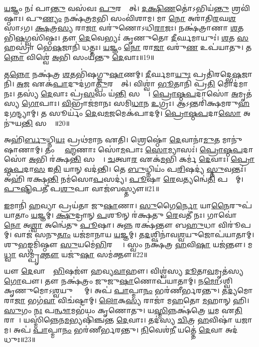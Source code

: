 \ul{𑌯}𑌜𑍍𑌞𑌂 𑌨𑌃॑ 𑌪𑌾\ul{𑌨𑍍𑌤𑍁} 𑌵𑌸॑𑌵𑌃 \ul{𑌪𑍁}𑌰𑌸𑍍𑌤𑌾᳚𑌤𑍍।
\ul{𑌦}\ul{𑌕𑍍𑌷𑌿}\ul{𑌣}𑌤𑍋॑\-𑌽𑌭𑌿𑌯॑\ul{𑌨𑍍𑌤𑍁} 𑌶𑍍𑌰𑌵𑌿॑𑌷𑍍𑌠𑌾𑌃।
𑌪𑍁\ul{𑌣𑍍𑌯𑌂} 𑌨𑌕𑍍𑌷॑𑌤𑍍𑌰\ul{𑌮}𑌭𑌿 𑌸𑌂𑌵𑌿॑𑌶𑌾𑌮।
𑌮𑌾 \ul{𑌨𑍋} 𑌅𑌰𑌾॑𑌤𑌿\ul{𑌰}𑌘\ul{𑌶}\ul{}𑌸𑌾\-𑌽𑌗\sn{}।
\ul{𑌕𑍍𑌷}𑌤𑍍𑌰\ul{𑌸𑍍𑌯} 𑌰𑌾\ul{𑌜𑌾} 𑌵𑌰𑍁॑𑌣𑍋\-𑌽𑌧𑌿\ul{𑌰𑌾}𑌜𑌃।
𑌨𑌕𑍍𑌷॑𑌤𑍍𑌰𑌾𑌣𑌾 \ul{𑌶}𑌤𑌭𑌿॑\ul{𑌷}𑌗𑍍𑌵𑌸𑌿॑𑌷𑍍𑌠𑌃।
𑌤𑍗 \ul{𑌦𑍇}𑌵𑍇𑌭𑍍𑌯𑌃॑ 𑌕𑍃𑌣𑍁𑌤𑍋 \ul{𑌦𑍀}𑌰𑍍𑌘𑌮𑌾𑌯𑍁𑌃॑।
\ul{𑌶}𑌤 \ul{𑌸}𑌹𑌸𑍍𑌰𑌾॑ 𑌭𑍇\ul{𑌷}𑌜𑌾𑌨𑌿॑ 𑌧𑌤𑍍𑌤𑌃।
\ul{𑌯}𑌜𑍍𑌞𑌂 \ul{𑌨𑍋} 𑌰𑌾\ul{𑌜𑌾} 𑌵𑌰𑍁॑\ul{𑌣} 𑌉𑌪॑𑌯𑌾𑌤𑍁।
𑌤\ul{𑌨𑍍𑌨𑍋} 𑌵𑌿𑌶𑍍𑌵𑍇॑ \ul{𑌅}𑌭𑌿 𑌸𑌂𑌯॑𑌨𑍍𑌤𑍁 \ul{𑌦𑍇}𑌵𑌾𑌃॥19॥

𑌤\ul{𑌨𑍍𑌨𑍋} 𑌨𑌕𑍍𑌷॑𑌤𑍍𑌰 \ul{𑌶}𑌤𑌭𑌿॑𑌷𑌗𑍍𑌜𑍁\ul{𑌷𑌾}𑌣𑌮𑍍।
\ul{𑌦𑍀}𑌰𑍍𑌘𑌮𑌾\ul{𑌯𑍁𑌃} 𑌪𑍍𑌰𑌤𑌿॑\-𑌰𑌦𑍍𑌭𑍇\ul{𑌷}𑌜𑌾𑌨𑌿॑।
\ul{𑌅}𑌜 𑌏𑌕॑\ul{𑌪𑌾}𑌦𑍁𑌦॑𑌗𑌾\ul{𑌤𑍍𑌪𑍁}𑌰𑌸𑍍𑌤𑌾᳚𑌤𑍍।
𑌵𑌿𑌶𑍍𑌵𑌾॑ \ul{𑌭𑍂}𑌤𑌾𑌨𑌿॑ 𑌪𑍍𑌰\ul{𑌤𑌿} 𑌮𑍋𑌦॑𑌮𑌾𑌨𑌃।
𑌤𑌸𑍍𑌯॑ \ul{𑌦𑍇}𑌵𑌾𑌃 𑌪𑍍𑌰॑\ul{𑌸}𑌵𑌂 𑌯॑\ul{𑌨𑍍𑌤𑌿} 𑌸𑌰𑍍𑌵𑍇᳚।
\ul{𑌪𑍍𑌰𑍋}\ul{𑌷𑍍𑌠}\ul{𑌪}𑌦𑌾𑌸𑍋॑ \ul{𑌅}𑌮𑍃𑌤॑𑌸𑍍𑌯 \ul{𑌗𑍋}𑌪𑌾𑌃।
\ul{𑌵𑌿}𑌭𑍍𑌰𑌾𑌜॑𑌮𑌾𑌨𑌃 𑌸𑌮𑌿\ul{𑌧𑌾}𑌨 \ul{𑌉}𑌗𑍍𑌰𑌃।
𑌆𑌽𑌨𑍍𑌤𑌰𑌿॑𑌕𑍍𑌷𑌮𑌰𑍁\ul{𑌹}𑌦\ul{𑌗}𑌨𑍍𑌦𑍍𑌯𑌾𑌮𑍍।
𑌤 𑌸𑍂𑌰𑍍𑌯𑌂॑ \ul{𑌦𑍇}𑌵\ul{𑌮}𑌜𑌮𑍇𑌕॑𑌪𑌾𑌦𑌮𑍍।
\ul{𑌪𑍍𑌰𑍋}\ul{𑌷𑍍𑌠}\ul{𑌪}𑌦𑌾\ul{𑌸𑍋} 𑌅𑌨𑍁॑𑌯\ul{𑌨𑍍𑌤𑌿} 𑌸𑌰𑍍𑌵𑍇᳚॥20॥

𑌅𑌹𑌿॑\ul{𑌰𑍍𑌬𑍁}𑌧𑍍𑌨𑌿\ul{𑌯𑌃} 𑌪𑍍𑌰𑌥॑𑌮𑌾𑌨 𑌏𑌤𑌿।
𑌶𑍍𑌰𑍇𑌷𑍍𑌠𑍋॑ \ul{𑌦𑍇}𑌵𑌾𑌨𑌾॑\ul{𑌮𑍁}𑌤 𑌮𑌾𑌨𑍁॑𑌷𑌾𑌣𑌾𑌮𑍍।
𑌤𑌂 𑌬𑍍𑌰𑌾᳚\ul{𑌹𑍍𑌮}𑌣𑌾𑌃 𑌸𑍋॑\ul{𑌮}𑌪𑌾𑌃 \ul{𑌸𑍋}𑌮𑍍𑌯𑌾𑌸𑌃॑।
\ul{𑌪𑍍𑌰𑍋}\ul{𑌷𑍍𑌠}\ul{𑌪}𑌦𑌾𑌸𑍋॑ \ul{𑌅}𑌭𑌿 𑌰॑𑌕𑍍𑌷\ul{𑌨𑍍𑌤𑌿} 𑌸𑌰𑍍𑌵𑍇᳚।
\ul{𑌚}𑌤𑍍𑌵𑌾\ul{𑌰} 𑌏𑌕॑\ul{𑌮}𑌭𑌿 𑌕𑌰𑍍𑌮॑ \ul{𑌦𑍇}𑌵𑌾𑌃।
\ul{𑌪𑍍𑌰𑍋}\ul{𑌷𑍍𑌠}\ul{𑌪}𑌦𑌾\ul{𑌸} 𑌇\ul{𑌤𑌿} 𑌯𑌾𑌨𑍍 𑌵𑌦॑𑌨𑍍𑌤𑌿।
𑌤𑍇 \ul{𑌬𑍁}𑌧𑍍𑌨𑌿𑌯𑌂॑ 𑌪\ul{𑌰𑌿}𑌷𑌦𑍍𑌯॑ \ul{𑌸𑍍𑌤𑍁}𑌵𑌨𑍍𑌤𑌃॑।
𑌅𑌹𑌿॑ 𑌰𑌕𑍍𑌷\ul{𑌨𑍍𑌤𑌿} 𑌨𑌮॑𑌸𑍋\ul{𑌪}𑌸𑌦𑍍𑌯॑।
\ul{𑌪𑍂}𑌷𑌾 \ul{𑌰𑍇}𑌵𑌤𑍍𑌯𑌨𑍍𑌵𑍇॑\ul{𑌤𑌿} 𑌪𑌨𑍍𑌥𑌾᳚𑌮𑍍।
\ul{𑌪𑍁}\ul{𑌷𑍍𑌟𑌿}𑌪𑌤𑍀॑ 𑌪\ul{𑌶𑍁}𑌪𑌾 𑌵𑌾𑌜॑𑌬𑌸𑍍𑌤𑍍𑌯𑍗॥21॥

\ul{𑌇}𑌮𑌾𑌨𑌿॑ \ul{𑌹}𑌵𑍍𑌯𑌾 𑌪𑍍𑌰𑌯॑𑌤𑌾 𑌜𑍁\ul{𑌷𑌾}𑌣𑌾।
\ul{𑌸𑍁}𑌗𑍈\ul{𑌰𑍍𑌨𑍋} 𑌯𑌾\ul{𑌨𑍈}𑌰𑍁𑌪॑𑌯𑌾𑌤𑌾𑌂 \ul{𑌯}𑌜𑍍𑌞𑌮𑍍।
\ul{𑌕𑍍𑌷𑍁}𑌦𑍍𑌰𑌾𑌨𑍍 \ul{𑌪}𑌶𑍂𑌨𑍍 𑌰॑𑌕𑍍𑌷𑌤𑍁 \ul{𑌰𑍇}𑌵𑌤𑍀॑ 𑌨𑌃।
𑌗𑌾𑌵𑍋॑ \ul{𑌨𑍋} 𑌅\ul{𑌶𑍍𑌵𑌾}\ul{} 𑌅𑌨𑍍𑌵𑍇॑𑌤𑍁 \ul{𑌪𑍂}𑌷𑌾।
𑌅\ul{𑌨𑍍𑌨}\ul{} 𑌰𑌕𑍍𑌷॑𑌨𑍍𑌤𑍗 𑌬\ul{𑌹𑍁}𑌧𑌾 𑌵𑌿𑌰𑍂॑𑌪𑌮𑍍।
𑌵𑌾𑌜॑ 𑌸𑌨𑍁\ul{𑌤𑌾𑌂} 𑌯𑌜॑𑌮𑌾𑌨𑌾𑌯 \ul{𑌯}𑌜𑍍𑌞𑌮𑍍।
𑌤\ul{𑌦}𑌶𑍍𑌵𑌿𑌨𑌾॑𑌵\ul{𑌶𑍍𑌵}𑌯𑍁𑌜𑍋𑌪॑𑌯𑌾𑌤𑌾𑌮𑍍।
𑌶𑍁\ul{𑌭}𑌙𑍍𑌗𑌮𑌿॑𑌷𑍍𑌠𑍗 \ul{𑌸𑍁}𑌯𑌮𑍇॑\ul{𑌭𑌿}𑌰𑌶𑍍𑌵𑍈𑌃᳚।
𑌸𑍍𑌵𑌂 𑌨𑌕𑍍𑌷॑𑌤𑍍𑌰 \ul{𑌹}𑌵𑌿\ul{𑌷𑌾} 𑌯𑌜॑𑌨𑍍𑌤𑍗।
𑌮\ul{𑌧𑍍𑌵𑌾} 𑌸𑌮𑍍𑌪𑍃॑\ul{𑌕𑍍𑌤𑍗} 𑌯𑌜𑍁॑\ul{𑌷𑌾} 𑌸𑌮॑𑌕𑍍𑌤𑍗॥22॥

𑌯𑍗 \ul{𑌦𑍇}𑌵𑌾𑌨𑌾𑌂᳚ \ul{𑌭𑌿}𑌷𑌜𑍗॑ 𑌹𑌵𑍍𑌯\ul{𑌵𑌾}𑌹𑍗।
𑌵𑌿𑌶𑍍𑌵॑𑌸𑍍𑌯 \ul{𑌦𑍂}𑌤𑌾\ul{𑌵}𑌮𑍃𑌤॑𑌸𑍍𑌯 \ul{𑌗𑍋}𑌪𑍗।
𑌤𑍗 𑌨𑌕𑍍𑌷॑𑌤𑍍𑌰𑌂 𑌜𑍁𑌜𑍁\ul{𑌷𑌾}𑌣𑍋𑌪॑𑌯𑌾𑌤𑌾𑌮𑍍।
𑌨\ul{𑌮𑍋}𑌽𑌶𑍍𑌵𑌿𑌭𑍍𑌯𑌾𑌂᳚ 𑌕𑍃𑌣𑍁𑌮𑍋\-𑌽\ul{𑌶𑍍𑌵}𑌯𑍁𑌗𑍍𑌭𑍍𑌯𑌾᳚𑌮𑍍।
𑌅𑌪॑ \ul{𑌪𑌾}𑌪𑍍𑌮𑌾\ul{𑌨𑌂} 𑌭𑌰॑𑌣𑍀𑌰𑍍𑌭𑌰𑌨𑍍𑌤𑍁।
𑌤\ul{𑌦𑍍𑌯}𑌮𑍋 𑌰𑌾\ul{𑌜𑌾} 𑌭𑌗॑\ul{𑌵𑌾}\an{} 𑌵𑌿𑌚॑𑌷𑍍𑌟𑌾𑌮𑍍।
\ul{𑌲𑍋}𑌕\ul{𑌸𑍍𑌯} 𑌰𑌾𑌜𑌾॑ 𑌮\ul{𑌹}𑌤𑍋 \ul{𑌮}𑌹𑌾𑌨𑍍 𑌹𑌿।
\ul{𑌸𑍁}𑌗𑌂 \ul{𑌨𑌃} 𑌪\ul{𑌨𑍍𑌥𑌾}𑌮𑌭॑𑌯𑌂 𑌕𑍃𑌣𑍋𑌤𑍁।
𑌯\ul{𑌸𑍍𑌮𑌿}𑌨𑍍𑌨𑌕𑍍𑌷॑𑌤𑍍𑌰𑍇 \ul{𑌯}𑌮 𑌏\ul{𑌤𑌿} 𑌰𑌾𑌜𑌾᳚।
𑌯𑌸𑍍𑌮𑌿॑𑌨𑍍𑌨𑍇𑌨\ul{𑌮}𑌭𑍍𑌯𑌷𑌿॑𑌞𑍍𑌚𑌨𑍍𑌤 \ul{𑌦𑍇}𑌵𑌾𑌃।
𑌤𑌦॑𑌸𑍍𑌯 \ul{𑌚𑌿}𑌤𑍍𑌰 \ul{𑌹}𑌵𑌿𑌷𑌾॑ 𑌯𑌜𑌾𑌮।
𑌅𑌪॑ \ul{𑌪𑌾}𑌪𑍍𑌮𑌾\ul{𑌨𑌂} 𑌭𑌰॑𑌣𑍀𑌰𑍍𑌭𑌰𑌨𑍍𑌤𑍁।
\ul{𑌨𑌿}𑌵𑍇𑌶॑\ul{𑌨𑍀} 𑌯𑌤𑍍𑌤𑍇॑ \ul{𑌦𑍇}𑌵𑌾 𑌅𑌦॑𑌧𑍁𑌃॥23॥\anuvakamend[\ul{𑌤}𑌤𑌾\ul{𑌰} 𑌮𑌹𑍍𑌯𑌂॑ 𑌪𑍍𑌰𑌾\ul{𑌸}𑌚𑍀𑌰𑍍𑌯𑌾 𑌯𑌾᳚𑌨𑍍𑌤𑍁 \ul{𑌯}𑌜𑍍𑌞𑌂 𑌵𑌾𑌚\dng{ꣴ}॑ \ul{𑌸𑍍𑌵}𑌸𑍍𑌤𑌿 \ul{𑌦𑍇}𑌵𑌾 𑌅𑌨𑍁॑𑌯\ul{𑌨𑍍𑌤𑌿} 𑌸\ul{𑌰𑍍𑌵𑍇} 𑌵𑌾𑌜॑𑌬\ul{𑌸𑍍𑌤𑍍𑌯𑍗} 𑌸𑌮॑𑌕𑍍𑌤𑍗 \ul{𑌦𑍇}𑌵𑌾𑌸𑍍𑌤𑍍𑌰𑍀𑌣𑌿॑ 𑌚]

